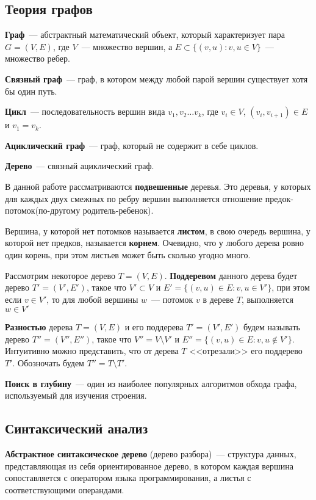 \subsection{Теория графов}

\textbf{Граф}~--- абстрактный математический объект, который характеризует 
пара $G = (V, E)$, где $V$~--- множество вершин, а $E \subset \{(v, u): v, u \in V\}$~--- множество ребер. 

\textbf{Связный граф}~--- граф, в котором между любой парой вершин существует хотя бы один путь.

\textbf{Цикл}~--- последовательность вершин вида $v_1, v_2 \dots v_k$, где $v_i \in V$, 
$(v_i, v_{i+1}) \in E$ и $v_1 = v_k$.

\textbf{Ациклический граф}~--- граф, который не содержит в себе циклов.

\textbf{Дерево}~--- связный ациклический граф.

В данной работе рассматриваются \textbf{подвешенные} деревья. Это деревья, у которых для каждых двух смежных по ребру
вершин выполняется отношение предок-потомок(по-другому родитель-ребенок).

Вершина, у которой нет потомков называется \textbf{листом}, в свою очередь вершина, у которой нет предков,
называется \textbf{корнем}. Очевидно, что у любого дерева ровно один корень, при этом листьев может быть сколько угодно много.

Рассмотрим некоторое дерево $T = (V, E)$. \textbf{Поддеревом} данного дерева будет дерево $T' = (V', E')$, такое что
$V' \subset V$ и $E' = \{(v, u) \in E : v, u \in V'\}$, при этом если $v \in V'$, то для любой
вершины $w$~--- потомок $v$ в дереве $T$, выполняется $w \in V'$

\textbf{Разностью} дерева $T = (V, E)$ и его поддерева $T' = (V', E')$ будем называть дерево $T'' = (V'', E'')$,
такое что $V'' = V \setminus V'$ и $E'' = \{(v, u) \in E : v, u \notin V'\}$. Интуитивно можно представить, что от дерева
$T$ <<отрезали>> его поддерево $T'$. Обозночать будем $T'' = T \setminus T'$.


\textbf{Поиск в глубину}~--- один из наиболее популярных алгоритмов обхода графа, используемый для изучения строения. 

\subsection{Синтаксический анализ}

\textbf{Абстрактное синтаксическое дерево} (дерево разбора)~--- структура данных, представляющая из себя ориентированное дерево, 
в котором каждая вершина сопоставляется с оператором языка программирования, а листья с соответствующими операндами. 

